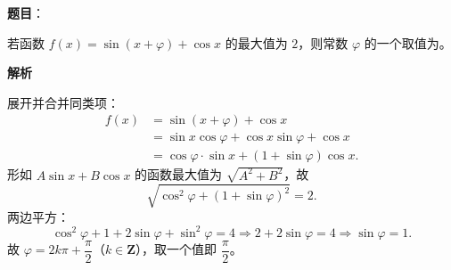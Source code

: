 \begin{answer}

\textbf{题目}：

若函数 $f(x)=\sin(x+\varphi)+\cos x$ 的最大值为 $2$，则常数 $\varphi$ 的一个取值为\gkblank{}。

\textbf{解析}

展开并合并同类项：
\nopagebreak[4]
\[\begin{aligned}
f(x)&=\sin(x+\varphi)+\cos x\\
&=\sin x\cos\varphi+\cos x\sin\varphi+\cos x\\
&=\cos\varphi\cdot\sin x+(1+\sin\varphi)\cos x .
\end{aligned}\]
形如 $A\sin x+B\cos x$ 的函数最大值为 $\sqrt{A^2+B^2}$，故
\nopagebreak[4]
\[\sqrt{\cos^2\varphi+(1+\sin\varphi)^2}=2 .\]
两边平方：
\nopagebreak[4]
\[\cos^2\varphi+1+2\sin\varphi+\sin^2\varphi=4\Longrightarrow 2+2\sin\varphi=4\Longrightarrow\sin\varphi=1 .\]
故 $\varphi=2k\pi+\dfrac\pi2$（$k\in\mathbf Z$），取一个值即 $\dfrac\pi2$。


\end{answer}
